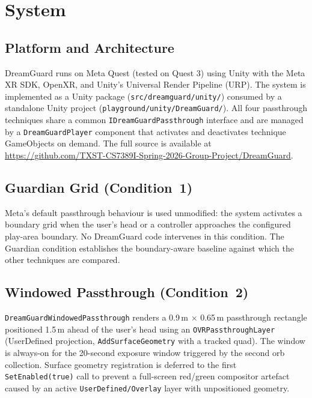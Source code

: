 \documentclass{styling/vgtc} %
\begin{document}
\section{System}
\label{sec:system}

\subsection{Platform and Architecture}

DreamGuard runs on Meta Quest (tested on Quest 3) using Unity with the
Meta XR SDK, OpenXR, and Unity's Universal Render Pipeline (URP). The
system is implemented as a Unity package
(\texttt{src/dreamguard/unity/}) consumed by a standalone Unity project
(\texttt{playground/unity/DreamGuard/}). All four passthrough techniques
share a common \texttt{IDreamGuardPassthrough} interface and are managed
by a \texttt{DreamGuardPlayer} component that activates and deactivates
technique GameObjects on demand. The full source is available at
\url{https://github.com/TXST-CS7389I-Spring-2026-Group-Project/DreamGuard}.

\subsection{Guardian Grid (Condition~1)}

Meta's default passthrough behaviour is used unmodified: the system
activates a boundary grid when the user's head or a controller
approaches the configured play-area boundary. No DreamGuard code
intervenes in this condition. The Guardian condition establishes the
boundary-aware baseline against which the other techniques are compared.

\subsection{Windowed Passthrough (Condition~2)}

\texttt{DreamGuardWindowedPassthrough} renders a 0.9\,m $\times$ 0.65\,m
passthrough rectangle positioned 1.5\,m ahead of the user's head using
an \texttt{OVRPassthroughLayer} (UserDefined projection,
\texttt{AddSurfaceGeometry} with a tracked quad). The window is always-on
for the 20-second exposure window triggered by the second orb collection.
Surface geometry registration is deferred to the first \texttt{SetEnabled(true)}
call to prevent a full-screen red/green compositor artefact caused by an
active \texttt{UserDefined/Overlay} layer with unpositioned geometry.
\end{document}
